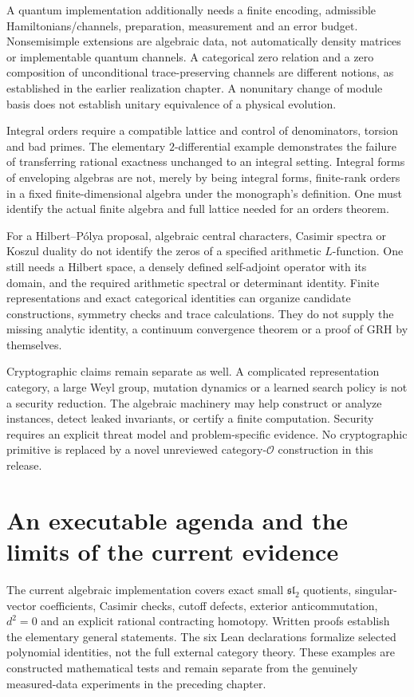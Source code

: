 A quantum implementation additionally needs a finite encoding, admissible Hamiltonians/channels, preparation, measurement and an error budget. Nonsemisimple extensions are algebraic data, not automatically density matrices or implementable quantum channels. A categorical zero relation and a zero composition of unconditional trace-preserving channels are different notions, as established in the earlier realization chapter. A nonunitary change of module basis does not establish unitary equivalence of a physical evolution.

Integral orders require a compatible lattice and control of denominators, torsion and bad primes. The elementary $2$-differential example demonstrates the failure of transferring rational exactness unchanged to an integral setting. Integral forms of enveloping algebras are not, merely by being integral forms, finite-rank orders in a fixed finite-dimensional algebra under the monograph's definition. One must identify the actual finite algebra and full lattice needed for an orders theorem.

For a Hilbert--P\'olya proposal, algebraic central characters, Casimir spectra or Koszul duality do not identify the zeros of a specified arithmetic $L$-function. One still needs a Hilbert space, a densely defined self-adjoint operator with its domain, and the required arithmetic spectral or determinant identity. Finite representations and exact categorical identities can organize candidate constructions, symmetry checks and trace calculations. They do not supply the missing analytic identity, a continuum convergence theorem or a proof of GRH by themselves.

Cryptographic claims remain separate as well. A complicated representation category, a large Weyl group, mutation dynamics or a learned search policy is not a security reduction. The algebraic machinery may help construct or analyze instances, detect leaked invariants, or certify a finite computation. Security requires an explicit threat model and problem-specific evidence. No cryptographic primitive is replaced by a novel unreviewed category-$\mathcal O$ construction in this release.

\section{An executable agenda and the limits of the current evidence}

The current algebraic implementation covers exact small $\mathfrak{sl}_2$ quotients, singular-vector coefficients, Casimir checks, cutoff defects, exterior anticommutation, $d^2=0$ and an explicit rational contracting homotopy. Written proofs establish the elementary general statements. The six Lean declarations formalize selected polynomial identities, not the full external category theory. These examples are constructed mathematical tests and remain separate from the genuinely measured-data experiments in the preceding chapter.


